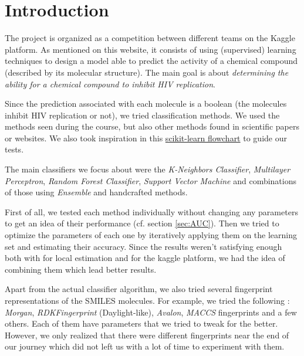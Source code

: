 \section{Introduction}
The project is organized as a competition between different teams on the Kaggle platform. As mentioned on this website, it consists of using (supervised) learning techniques to design a model able to predict the activity of a chemical compound (described by its molecular structure). The main goal is about {\it determining the ability for a chemical compound to inhibit HIV replication}. \cite{kaggle-iml2019}

Since the prediction associated with each molecule is a boolean (the molecules inhibit HIV replication or not), we tried classification methods. We used the methods seen during the course, but also other methods found in scientific papers or websites. We also took inspiration in this \href{https://scikit-learn.org/stable/tutorial/machine_learning_map/index.html}{scikit-learn flowchart} to guide our tests.

The main classifiers we focus about were the \emph{K-Neighbors Classifier}, \emph{Multilayer Perceptron}, \emph{Random Forest Classifier}, \emph{Support Vector Machine} and combinations of those using \emph{Ensemble} and handcrafted methods.

First of all, we tested each method individually without changing any parameters to get an idea of their performance (cf. section \ref{sec:AUC}). Then we tried to optimize the parameters of each one by iteratively applying them on the learning set and estimating their accuracy. Since the results weren't satisfying enough both with for local estimation and for the kaggle platform, we had the idea of combining them which lead better results.

Apart from the actual classifier algorithm, we also tried several fingerprint representations of the SMILES molecules. For example, we tried the following : \emph{Morgan}, \emph{RDKFingerprint} (Daylight-like), \emph{Avalon}, \emph{MACCS} fingerprints and a few others. Each of them have parameters that we tried to tweak for the better. However, we only realized that there were different fingerprints near the end of our journey which did not left us with a lot of time to experiment with them.
